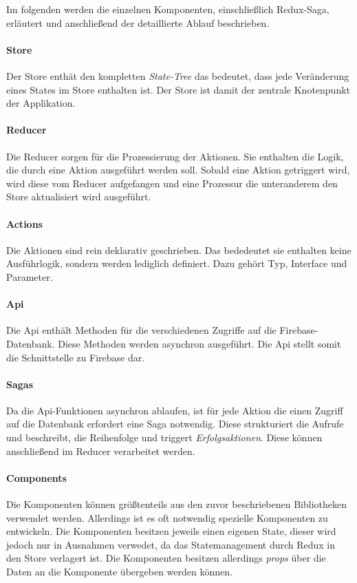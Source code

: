 Im folgenden werden die einzelnen Komponenten, einschließlich Redux-Saga, erläutert und 
anschließend der detaillierte Ablauf beschrieben. 

\paragraph{Store}
Der Store enthät den kompletten \textit{State-Tree} das bedeutet, dass jede Veränderung 
eines States im Store enthalten ist. Der Store ist damit der zentrale Knotenpunkt der 
Applikation.

\paragraph{Reducer}
Die Reducer sorgen für die Prozessierung der Aktionen. Sie enthalten die Logik, die 
durch eine Aktion ausgeführt werden soll. Sobald eine Aktion getriggert wird, wird diese vom 
Reducer aufgefangen und eine Prozessur die unteranderem den Store aktualisiert wird ausgeführt.

\paragraph{Actions}
Die Aktionen sind rein deklarativ geschrieben. Das bededeutet sie enthalten keine Ausführlogik, 
sondern werden lediglich definiert. Dazu gehört Typ, Interface und Parameter. 

\paragraph{Api}
Die Api enthält Methoden für die verschiedenen Zugriffe auf die Firebase-Datenbank. 
Diese Methoden werden asynchron ausgeführt. Die Api stellt somit die Schnittstelle
zu Firebase dar.

\paragraph{Sagas}
Da die Api-Funktionen asynchron ablaufen, ist für jede Aktion die einen Zugriff auf die 
Datenbank erfordert eine Saga notwendig. Diese strukturiert die Aufrufe und beschreibt, 
die Reihenfolge und triggert \textit{Erfolgsaktionen}. Diese können anschließend im Reducer
verarbeitet werden. 

\paragraph{Components}
Die Komponenten können größtenteils aus den zuvor beschriebenen Bibliotheken verwendet werden. 
Allerdings ist es oft notwendig spezielle Komponenten zu entwickeln. Die Komponenten besitzen 
jeweils einen eigenen State, dieser wird jedoch nur in Ausnahmen verwedet, da das Statemanagement
durch Redux in den Store verlagert ist. Die Komponenten besitzen allerdings \textit{props} über die 
Daten an die Komponente übergeben werden können. 

